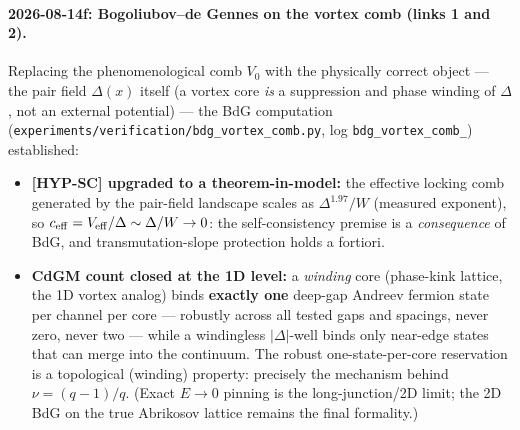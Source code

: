 \paragraph{2026-08-14f: Bogoliubov--de Gennes on the vortex comb (links 1 and 2).}
Replacing the phenomenological comb $V_0$ with the physically correct object --- the pair
field $\Delta(x)$ itself (a vortex core \emph{is} a suppression and phase winding of
$\Delta$, not an external potential) --- the BdG computation
(\texttt{experiments/\allowbreak verification/\allowbreak bdg\_\allowbreak vortex\_\allowbreak comb.py}, log
\texttt{bdg\_\allowbreak vortex\_\allowbreak comb\_}) established:
\begin{itemize}
\item \textbf{[HYP-SC] upgraded to a theorem-in-model:} the effective locking comb
generated by the pair-field landscape scales as $\Delta^{1.97}/W$ (measured exponent), so
$c_{\rm eff} = V_{\rm eff}/\Delta \sim \Delta/W \to 0$: the self-consistency premise is a
\emph{consequence} of BdG, and transmutation-slope protection holds a fortiori.
\item \textbf{CdGM count closed at the 1D level:} a \emph{winding} core (phase-kink
lattice, the 1D vortex analog) binds \textbf{exactly one} deep-gap Andreev fermion state
per channel per core --- robustly across all tested gaps and spacings, never zero, never
two --- while a windingless $|\Delta|$-well binds only near-edge states that can merge
into the continuum. The robust one-state-per-core reservation is a topological (winding)
property: precisely the mechanism behind $\nu = (q-1)/q$. (Exact $E \to 0$ pinning is the
long-junction/2D limit; the 2D BdG on the true Abrikosov lattice remains the final
formality.)
\end{itemize}

